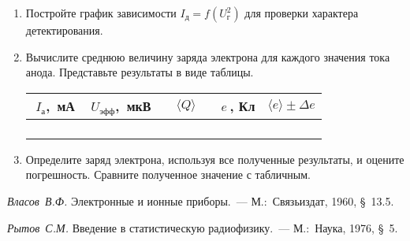 \begin{lab:task}
\begin{enumerate}

	\item Постройте график зависимости $I_{\text{д}}=f(U^2_{\text{г}})$ для
проверки характера детектирования.

	\item Вычислите среднюю величину заряда электрона для каждого значения тока
анода. Представьте результаты в виде таблицы.

\begin{center}
\begin{tabular}{|c|c|c|c|c|}
\hline $\;I_{\text{а}}$,~мА&$\;U_{\text{эфф}}$,~мкВ&$\quad\langle
Q\rangle\quad$&$e~$, Кл&$\langle e\rangle\pm\Delta e$\\\hline\hline
 & & & &\\
 & & & &\\
 & & & &\\
 & & & &\\
\hline
\end{tabular}
\end{center}

	\item Определите заряд электрона, используя все полученные результаты, и
оцените погрешность. Сравните полученное значение
с табличным.
	\end{enumerate}
\end{lab:task}

\begin{lab:literature}
	\item \emph{Власов~В.Ф.} Электронные и ионные приборы.~--- М.:~Связьиздат,
1960, \S~13.5.

	\item \emph{Рытов~С.М.} Введение в статистическую радиофизику.~---
М.:~Наука, 1976, \S~5.
\end{lab:literature}
